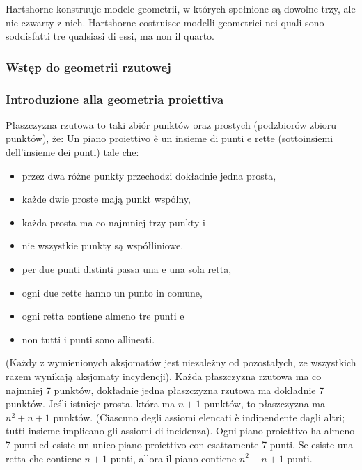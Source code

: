 Hartshorne \cite[s. 69-70]{hartshorne_2000} konstruuje modele geometrii, w których spełnione są dowolne trzy, ale nie czwarty z nich. %
Hartshorne \cite[p. 69--70]{hartshorne_2000} costruisce modelli geometrici nei quali sono soddisfatti tre qualsiasi di essi, ma non il quarto. %

\subsubsection{Wstęp do geometrii rzutowej} %
\subsubsection{Introduzione alla geometria proiettiva} %

\begin{proposition}
    Płaszczyzna rzutowa to taki zbiór punktów oraz prostych (podzbiorów zbioru punktów), że: %
    Un piano proiettivo è un insieme di punti e rette (sottoinsiemi dell'insieme dei punti) tale che: %
    \begin{itemize}
        \item przez dwa różne punkty przechodzi dokładnie jedna prosta, %
        \item każde dwie proste mają punkt wspólny, %
        \item każda prosta ma co najmniej trzy punkty i %
        \item nie wszystkie punkty są współliniowe. %
        \item per due punti distinti passa una e una sola retta, %
        \item ogni due rette hanno un punto in comune, %
        \item ogni retta contiene almeno tre punti e %
        \item non tutti i punti sono allineati. %
    \end{itemize}
    (Każdy z wymienionych aksjomatów jest niezależny od pozostałych, ze wszystkich razem wynikają aksjomaty incydencji). %
    Każda płaszczyzna rzutowa ma co najmniej 7 punktów, dokładnie jedna płaszczyzna rzutowa ma dokładnie 7 punktów. %
    Jeśli istnieje prosta, która ma $n+1$ punktów, to płaszczyzna ma $n^2 + n + 1$ punktów. %
    (Ciascuno degli assiomi elencati è indipendente dagli altri; tutti insieme implicano gli assiomi di incidenza). %
    Ogni piano proiettivo ha almeno 7 punti ed esiste un unico piano proiettivo con esattamente 7 punti. %
    Se esiste una retta che contiene $n+1$ punti, allora il piano contiene $n^2+n+1$ punti. %
\end{proposition}

